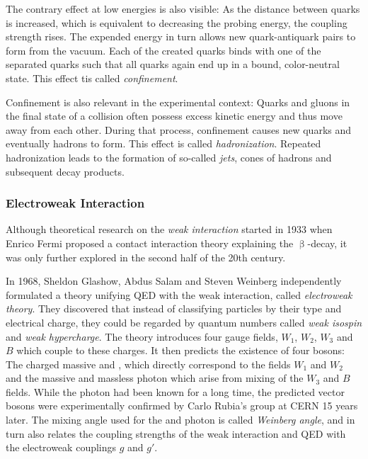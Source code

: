 The contrary effect at low energies is also visible: As the distance between quarks is increased, which is equivalent to decreasing the probing energy, the coupling strength rises. The expended energy in turn allows new quark-antiquark pairs to form from the vacuum. Each of the created quarks binds with one of the separated quarks such that all quarks again end up in a bound, color-neutral state. This effect tis called \emph{confinement}.

Confinement is also relevant in the experimental context: Quarks and gluons in the final state of a collision often possess excess kinetic energy and thus move away from each other. During that process, confinement causes new quarks and eventually hadrons to form. This effect is called \emph{hadronization}. Repeated hadronization leads to the formation of so-called \emph{jets}, cones of hadrons and subsequent decay products.


\subsubsection{Electroweak Interaction}
Although theoretical research on the \emph{weak interaction} started in 1933 when Enrico Fermi proposed a contact interaction theory explaining the $\upbeta$-decay\cite{Fermi:Tentativodiuna}, it was only further explored in the second half of the 20th century. 

In 1968, Sheldon Glashow\cite{Glashow:PartialSymmetriesWeak}, Abdus Salam\cite{Salam:WeakElectromagneticInteractions} and Steven Weinberg\cite{Weinberg:modelleptons} independently formulated a theory unifying \ac{QED} with the weak interaction, called \emph{electroweak theory}. They discovered that instead of classifying particles by their type and electrical charge, they could be regarded by quantum numbers called \emph{weak isospin} and \emph{weak hypercharge}. The theory introduces four gauge fields, $W_1$, $W_2$, $W_3$ and $B$ which couple to these charges. It then predicts the existence of four bosons: The charged massive \PWp and \PWm, which directly correspond to the fields $W_1$ and $W_2$ and the massive \PZ and massless photon which arise from mixing of the $W_3$ and $B$ fields. While the photon had been known for a long time, the predicted vector bosons were experimentally confirmed by Carlo Rubia's group at \acs{CERN}\cite{Arnison:ExperimentalObservationIsolated,Arnison:Experimentalobservationlepton} 15 years later.
The mixing angle used for the \PZ and photon is called \emph{Weinberg angle}, and in turn also relates the coupling strengths of the weak interaction and \ac{QED} with the electroweak couplings $g$ and $g'$\cite{Schleper:TeilchenphysikfuerFortgeschrittene}.

